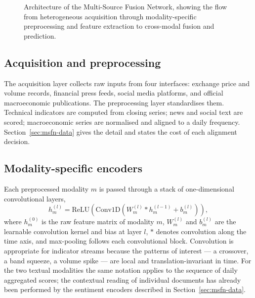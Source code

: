 \begin{figure}[!htb]
{}
\caption[Architecture of the Multi-Source Fusion Network]{Architecture of the Multi-Source
Fusion Network, showing the flow from heterogeneous acquisition through modality-specific
preprocessing and feature extraction to cross-modal fusion and prediction.}
\label{fig:msfn}
\end{figure}

\subsection{Acquisition and preprocessing}

The acquisition layer collects raw inputs from four interfaces: exchange price and volume
records, financial press feeds, social media platforms, and official macroeconomic
publications. The preprocessing layer standardises them. Technical indicators are computed from
closing series; news and social text are scored; macroeconomic series are normalised and aligned
to a daily frequency. Section~\ref{sec:msfn-data} gives the detail and states the cost of each
alignment decision.

\subsection{Modality-specific encoders}

Each preprocessed modality $m$ is passed through a stack of one-dimensional convolutional
layers,
\begin{equation}
h_m^{(l)} = \mathrm{ReLU}\!\left(\mathrm{Conv1D}\!\left(W_m^{(l)} * h_m^{(l-1)} +
b_m^{(l)}\right)\right),
\label{eq:msfn-conv}
\end{equation}
where $h_m^{(0)}$ is the raw feature matrix of modality $m$, $W_m^{(l)}$ and $b_m^{(l)}$ are the
learnable convolution kernel and bias at layer $l$, $*$ denotes convolution along the time axis,
and max-pooling follows each convolutional block. Convolution is appropriate for indicator
streams because the patterns of interest --- a crossover, a band squeeze, a volume spike --- are
local and translation-invariant in time. For the two textual modalities the same notation
applies to the sequence of daily aggregated scores; the contextual reading of individual
documents has already been performed by the sentiment encoders described in
Section~\ref{sec:msfn-data}.

